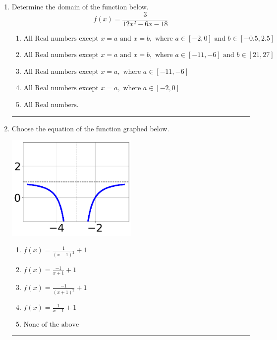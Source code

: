 \documentclass[14pt]{extbook}
\newcommand{\litem}[1]{\item#1\hspace*{-1cm}\rule{\textwidth}{0.4pt}}
\begin{document}
\begin{enumerate}
{\begin{enumerate}[label=\Alph*.]
\end{enumerate} }
\litem{
Determine the domain of the function below.\[ f(x) = \frac{3}{12x^{2} -6 x -18} \]\begin{enumerate}[label=\Alph*.]
\item \( \text{All Real numbers except } x = a \text{ and } x = b, \text{ where } a \in [-2, 0] \text{ and } b \in [-0.5, 2.5] \)
\item \( \text{All Real numbers except } x = a \text{ and } x = b, \text{ where } a \in [-11, -6] \text{ and } b \in [21, 27] \)
\item \( \text{All Real numbers except } x = a, \text{ where } a \in [-11, -6] \)
\item \( \text{All Real numbers except } x = a, \text{ where } a \in [-2, 0] \)
\item \( \text{All Real numbers.} \)

\end{enumerate} }
\litem{
Choose the equation of the function graphed below.
\begin{center}
    \includegraphics[width=0.5\textwidth]{../Figures/rationalGraphToEquationCopyC.png}
\end{center}
\begin{enumerate}[label=\Alph*.]
\item \( f(x) = \frac{1}{(x - 1)^2} + 1 \)
\item \( f(x) = \frac{-1}{x + 1} + 1 \)
\item \( f(x) = \frac{-1}{(x + 1)^2} + 1 \)
\item \( f(x) = \frac{1}{x - 1} + 1 \)
\item \( \text{None of the above} \)


\end{enumerate}}
\end{enumerate}
\end{document}
